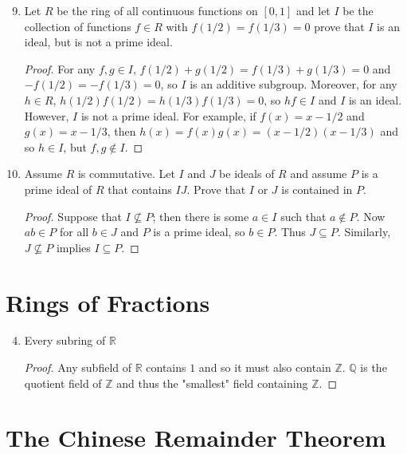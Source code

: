 \documentclass{report}
\newcommand{\Z}{\mathbb{Z}}
\newcommand{\Q}{\mathbb{Q}}
\newcommand{\R}{\mathbb{R}}
\begin{document}
\begin{enumerate}
    
    \setcounter{enumi}{8}
    \item Let $R$ be the ring of all continuous functions on $[0,1]$ and let $I$ be the collection of functions $f\in R$ with $f(1/2)=f(1/3)=0$ prove that $I$ is an ideal, but is not a prime ideal. 
    \begin{proof}
        For any $f,g\in I$, $f(1/2)+g(1/2)=f(1/3)+g(1/3)=0$ and $-f(1/2)=-f(1/3)=0$, so $I$ is an additive subgroup. Moreover, for any $h\in R$, $h(1/2)f(1/2)=h(1/3)f(1/3)=0$, so $hf\in I$ and $I$ is an ideal. However, $I$ is not a prime ideal. For example, if $f(x)=x-1/2$ and $g(x)=x-1/3$, then $h(x)=f(x)g(x)=(x-1/2)(x-1/3)$ and so $h\in I$, but $f,g\notin I$.
    \end{proof}

    
    \setcounter{enumi}{10}
    \item Assume $R$ is commutative. Let $I$ and $J$ be ideals of $R$ and assume $P$ is a prime ideal of $R$ that contains $IJ$. Prove that $I$ or $J$ is contained in $P$. 
    \begin{proof}
        Suppose that $I\not\subseteq P$; then there is some $a\in I$ such that $a\notin P$. Now $ab\in P$ for all $b\in J$ and $P$ is a prime ideal, so $b\in P$. Thus $J\subseteq P$. Similarly, $J\not\subseteq P$ implies $I\subseteq P$.
    \end{proof}
\end{enumerate}


\section{Rings of Fractions}
\begin{enumerate}
    \setcounter{enumi}{3}
    \item Every subring of $\R$
    \begin{proof}
        Any subfield of $\R$ contains $1$ and so it must also contain $\Z$. $\Q$ is the quotient field of $\Z$ and thus the "smallest" field containing $\Z$.
    \end{proof}
\end{enumerate}


\section{The Chinese Remainder Theorem}
\end{document}
